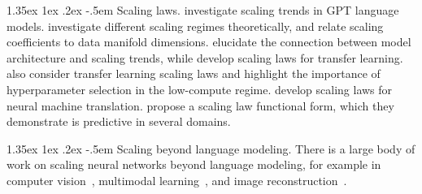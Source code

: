 \documentclass[dvipsnames,11pt]{article}
\makeatletter
\renewcommand\paragraph{\@startsection{paragraph}{4}{\z@}                                     {1.35ex \@plus1ex \@minus.2ex}                                {-.5em}
{\normalfont\normalsize\bfseries}}
\makeatother
\begin{document}
\begin{appendix}
\paragraph{Scaling laws.}
\citet{kaplan2020scaling} investigate scaling trends in GPT language models. 
\citet{bahri2021explaining} investigate different scaling regimes theoretically, and \citet{sharma_ScalingLawsData_2022} relate scaling coefficients to data manifold dimensions.
\citet{tay2021scale,tay-etal-2023-scaling} elucidate the connection between model architecture and scaling trends, while \citet{Hernandez2021ScalingLF,tay2021scale} develop scaling laws for transfer learning.
\citet{ivgi2022scaling} also consider transfer learning scaling laws and highlight the importance of hyperparameter selection in the low-compute regime.
\citet{ghorbani2021scaling,gordon-etal-2021-data,bansal2022data} develop scaling laws for neural machine translation.
\citet{caballero2023broken} propose a scaling law functional form, which they demonstrate is predictive in several domains.

\paragraph{Scaling beyond language modeling.}
There is a large body of work on scaling neural networks beyond language modeling, for example in computer vision~\cite{liu2022convnet,zhai2022scaling,sorscher2022beyond,abnar2022exploring,alabdulmohsin2022revisiting}, multimodal learning~\cite{Henighan2020ScalingLF,cherti2023reproducible,datacomp}, and image reconstruction~\cite{klug2023analyzing}. 


\end{appendix}
\end{document}
